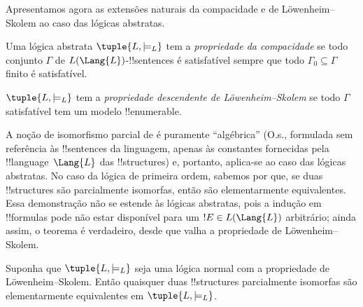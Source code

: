 \documentclass[../../../include/open-logic-section]{subfiles}
\begin{document}


Apresentamos agora as extensões naturais da compacidade e de
L\"owenheim--Skolem ao caso das lógicas abstratas.

\begin{defn}
Uma lógica abstrata $\tuple{L, \models_L}$ tem a \emph{propriedade da
  compacidade} se todo conjunto $\Gamma$ de
$L(\Lang{L})$-!!{sentence}s é satisfatível sempre que todo
$\Gamma_0 \subseteq \Gamma$ finito é satisfatível.
\end{defn}

\begin{defn}
$\tuple{L, \models_L}$ tem a \emph{propriedade descendente de
  L\"owenheim--Skolem} se todo $\Gamma$ satisfatível tem um modelo
!!{enumerable}.
\end{defn}


A noção de isomorfismo parcial de
 é puramente ``algébrica'' (O.s.\@, formulada sem referência às !!{sentence}s da linguagem, apenas às
constantes fornecidas pela !!{language}~$\Lang{L}$ das
!!{structure}s) e, portanto, aplica-se ao caso das lógicas abstratas.
No caso da lógica de primeira ordem, sabemos por
 que, se duas !!{structure}s são
parcialmente isomorfas, então são elementarmente equivalentes. Essa
demonstração não se estende às lógicas abstratas, pois a indução em
!!{formula}s pode não estar disponível para um
$!E \in L(\Lang{L})$ arbitrário; ainda assim, o teorema é verdadeiro,
desde que valha a propriedade de L\"owenheim--Skolem.

\begin{thm}
Suponha que $\tuple{L, \models_L}$ seja uma lógica normal com a
propriedade de L\"owenheim--Skolem. Então quaisquer duas !!{structure}s
parcialmente isomorfas são elementarmente equivalentes em
$\tuple{L, \models_L}$.
\end{thm}
\end{document}
